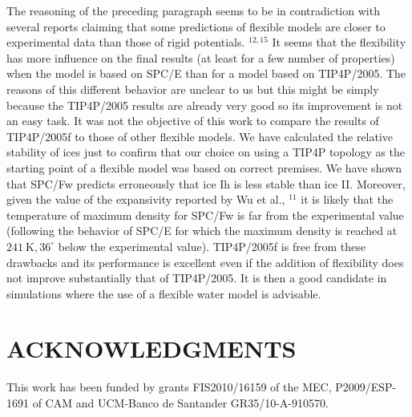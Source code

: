 \documentclass[10pt]{article}
\begin{document}
The reasoning of the preceding paragraph seems to be in contradiction with several reports claiming that some predictions of flexible models are closer to experimental data than those of rigid potentials. ${ }^{12,15}$ It seems that the flexibility has more influence on the final results (at least for a few number of properties) when the model is based on SPC/E than for a model based on TIP4P/2005. The reasons of this different behavior are unclear to us but this might be simply because the TIP4P/2005 results are already very good so its improvement is not an easy task. It was not the objective of this work to compare the results of TIP4P/2005f to those of other flexible models. We have calculated the relative stability of ices just to confirm that our choice on using a TIP4P topology as the starting point of a flexible model was based on correct premises. We have shown that SPC/Fw predicts erroneously that ice Ih is less stable than ice II. Moreover, given the value of the expansivity reported by Wu et al., ${ }^{11}$ it is likely that the temperature of maximum density for SPC/Fw is far from the experimental value (following the behavior of SPC/E for which the maximum density is reached at $241 \mathrm{~K}, 36^{\circ}$ below the experimental value). TIP4P/2005f is free from these drawbacks and its performance is excellent even if the addition of flexibility does not improve substantially that of TIP4P/2005. It is then a good candidate in simulations where the use of a flexible water model is advisable.

\section*{ACKNOWLEDGMENTS}
This work has been funded by grants FIS2010/16159 of the MEC, P2009/ESP-1691 of CAM and UCM-Banco de Santander GR35/10-A-910570.
\end{document}
